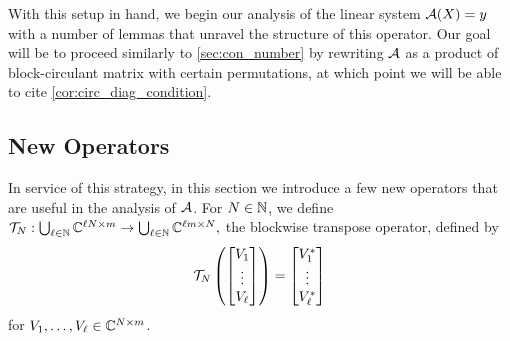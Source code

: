 With this setup in hand, we begin our analysis of the linear system $\mathcal{A}(X) = y$ with a number of lemmas that unravel the structure of this operator.  Our goal will be to proceed similarly to \cref{sec:con_number} by rewriting $\mathcal{A}$ as a product of block-circulant matrix with certain permutations, at which point we will be able to cite \cref{cor:circ_diag_condition}.

\subsection{New Operators}
\label{sec:pty_new_op}
In service of this strategy, in this section we introduce a few new operators that are useful in the analysis of $\mathcal{A}$.  For $N \in \mathbb{N}$, we define $\mathcal{T}_N : \bigcup_{\ell \in \mathbb{N}} \mathbb{C}^{\ell N \times m} \to \bigcup_{\ell \in \mathbb{N}} \mathbb{C}^{\ell m \times N},$ the blockwise transpose operator, defined by \begin{equation} \mathcal{T}_N\left(\begin{bmatrix} V_1 \\ \vdots \\ V_\ell \end{bmatrix}\right) = \begin{bmatrix} V_1^* \\ \vdots \\ V_{\ell}^* \end{bmatrix}\label{eq:blk_trans_op} \end{equation} for $V_1, \ldots, V_\ell \in \mathbb{C}^{N \times m}$.

